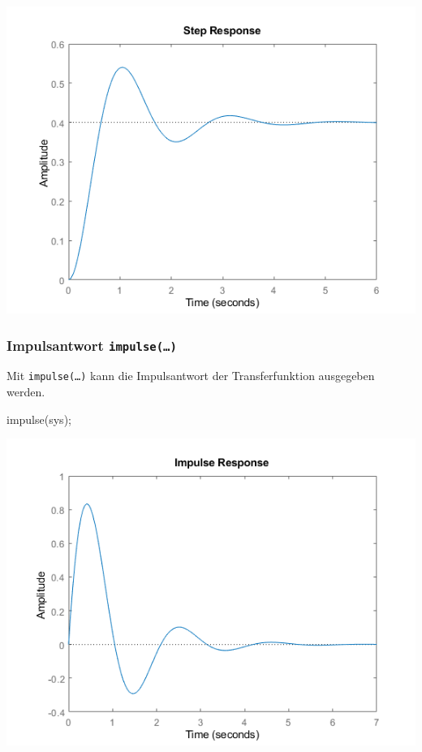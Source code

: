 \documentclass[
  10pt,
  a4paper,
  german]{article}
\newenvironment{Shaded}{}{}
\newcommand{\NormalTok}[1]{\textcolor[rgb]{0.14,0.16,0.18}{#1}}
\newcommand{\OperatorTok}[1]{\textcolor[rgb]{0.14,0.16,0.18}{#1}}
\newcommand{\VariableTok}[1]{\textcolor[rgb]{0.89,0.38,0.04}{#1}}
\numberwithin{equation}{section}
\begin{document}
\begin{multicols}{2}
\includegraphics{images/matlab_StepResponsePlot.png}

\hypertarget{impulsantwort-impulse}{%
\subsubsection{\texorpdfstring{Impulsantwort
\texttt{impulse(…)}}{Impulsantwort impulse(\ldots)}}\label{impulsantwort-impulse}}

Mit \texttt{impulse(…)} kann die Impulsantwort der Transferfunktion
ausgegeben werden.

\begin{Shaded}
\begin{Highlighting}[]
\VariableTok{impulse}\NormalTok{(}\VariableTok{sys}\NormalTok{)}\OperatorTok{;}
\end{Highlighting}
\end{Shaded}

\includegraphics{images/matlab_ImpulseResponsePlot.png}


\end{multicols}
\end{document}
